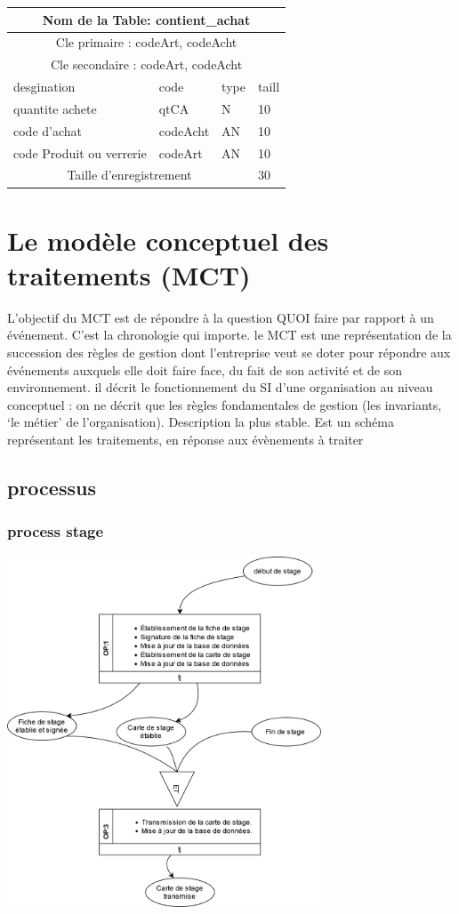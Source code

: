 \begin{tabular}{ |p{5cm}||p{4cm}|p{3cm}|p{3cm}|  }
    \hline
    \multicolumn{4}{|c|}{Nom de la Table: contient\_achat } \\
    \hline
    \multicolumn{4}{|c|}{Cle primaire : codeArt, codeAcht} \\
    \hline
    \multicolumn{4}{|c|}{Cle secondaire :  codeArt, codeAcht } \\
    \hline
    \hline
    desgination&code&type&taill \\
    \hline
    quantite achete&qtCA&N&10 \\
    code d'achat&codeAcht&AN&10 \\
    code Produit ou verrerie&codeArt&AN&10 \\
    \hline
    \hline
    \multicolumn{3}{|c|}{Taille d’enregistrement} & 30\\
    \hline
\end{tabular}

\vspace{2cm}

\section{Le modèle conceptuel des traitements (MCT)}
L’objectif du MCT est de répondre à la question QUOI faire par rapport à un
événement.
C’est la chronologie qui importe.
le MCT est une représentation de la succession des règles de gestion dont
l’entreprise veut se doter pour répondre aux événements auxquels elle doit
faire face, du fait de son activité et de son environnement.
il décrit le fonctionnement du SI d’une organisation au niveau conceptuel : on
ne décrit que les règles fondamentales de gestion (les invariants, ‘le métier’ de
l’organisation).
Description la plus stable.
Est un schéma représentant les traitements, en réponse aux évènements à traiter
\subsection{processus}
\subsubsection{process stage}
\includegraphics[width=0.7\textwidth]{chapter/Conceptual Study/processus/stage.mct.png}
